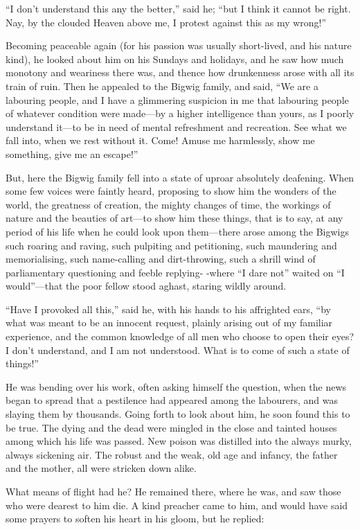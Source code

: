``I don't understand this any the better,'' said he; ``but I think it
cannot be right.  Nay, by the clouded Heaven above me, I protest
against this as my wrong!''

Becoming peaceable again (for his passion was usually short-lived,
and his nature kind), he looked about him on his Sundays and
holidays, and he saw how much monotony and weariness there was, and
thence how drunkenness arose with all its train of ruin.  Then he
appealed to the Bigwig family, and said, ``We are a labouring people,
and I have a glimmering suspicion in me that labouring people of
whatever condition were made---by a higher intelligence than yours,
as I poorly understand it---to be in need of mental refreshment and
recreation.  See what we fall into, when we rest without it.  Come!
Amuse me harmlessly, show me something, give me an escape!''

But, here the Bigwig family fell into a state of uproar absolutely
deafening.  When some few voices were faintly heard, proposing to
show him the wonders of the world, the greatness of creation, the
mighty changes of time, the workings of nature and the beauties of
art---to show him these things, that is to say, at any period of his
life when he could look upon them---there arose among the Bigwigs
such roaring and raving, such pulpiting and petitioning, such
maundering and memorialising, such name-calling and dirt-throwing,
such a shrill wind of parliamentary questioning and feeble replying-%
-where ``I dare not'' waited on ``I would''---that the poor fellow stood
aghast, staring wildly around.

``Have I provoked all this,'' said he, with his hands to his
affrighted ears, ``by what was meant to be an innocent request,
plainly arising out of my familiar experience, and the common
knowledge of all men who choose to open their eyes?  I don't
understand, and I am not understood.  What is to come of such a
state of things!''

He was bending over his work, often asking himself the question,
when the news began to spread that a pestilence had appeared among
the labourers, and was slaying them by thousands.  Going forth to
look about him, he soon found this to be true.  The dying and the
dead were mingled in the close and tainted houses among which his
life was passed.  New poison was distilled into the always murky,
always sickening air.  The robust and the weak, old age and infancy,
the father and the mother, all were stricken down alike.

What means of flight had he?  He remained there, where he was, and
saw those who were dearest to him die.  A kind preacher came to him,
and would have said some prayers to soften his heart in his gloom,
but he replied:

